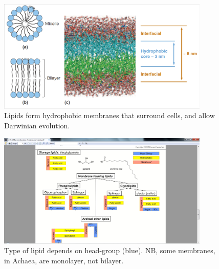 \documentclass[]{article}
\begin{document}
\begin{figure}[H]
	\caption[How lipids  allow Darwinian evolution.]{Lipids form hydrophobic membranes that surround cells, and allow Darwinian evolution.}\label{fig:Lipids} 
	\includegraphics[width=0.9\textwidth]{Lipids}
\end{figure}

\begin{figure}[H]
	\caption[Type of lipid depends on head-group]{Type of lipid depends on head-group (blue). NB, some membranes, in Achaea, are monolayer, not bilayer.}\label{fig:LipidTypes} 
	\includegraphics[width=0.9\textwidth]{LipidTypes}
\end{figure}
\end{document}
